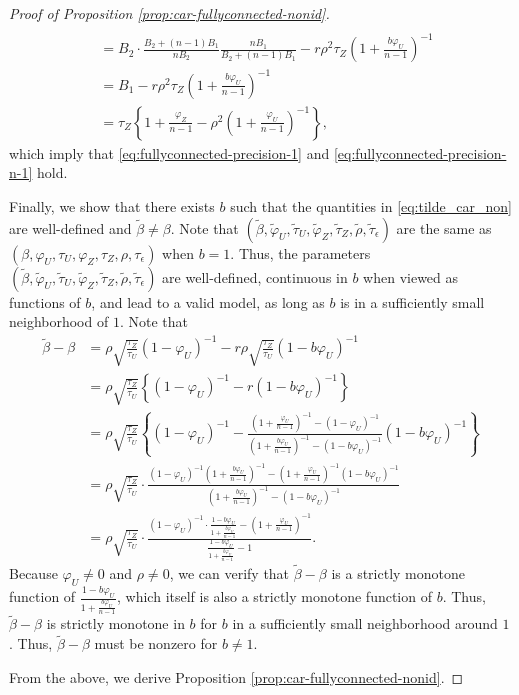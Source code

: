 \documentclass[11pt]{article}
\theoremstyle{definition}
\theoremstyle{remark}
\begin{document}
\begin{proof}[Proof of Proposition \ref{prop:car-fullyconnected-nonid}]
\begin{align*}
\\
&= 
B_2 \cdot \frac{B_2+(n-1)B_1}{nB_2}
\frac{n B_1}{B_2 + (n-1)B_1} - r\rho^2\tau_Z \left(1+\frac{b\varphi_U}{n-1}\right)^{-1}
\\ &= B_1 - r\rho^2\tau_Z \left(1+\frac{b\varphi_U}{n-1}\right)^{-1}
\\
& = \tau_Z\left\{1+\frac{\varphi_Z}{n-1} - \rho^2 \left(1+ \frac{\varphi_U}{n-1}\right)^{-1} \right\}, 
\end{align*} 
which imply that \eqref{eq:fullyconnected-precision-1}
and \eqref{eq:fullyconnected-precision-n-1} hold. 


Finally, we show that there exists $b$ such that the quantities in \eqref{eq:tilde_car_non} are well-defined and $\tilde\beta \ne \beta$. 
Note that $(\tilde\beta, \tilde\varphi_U, \tilde\tau_U, \tilde\varphi_Z, \tilde\tau_Z, \tilde\rho, \tilde\tau_\epsilon)$ are the same as $(\beta, \varphi_U, \tau_U, \varphi_Z, \tau_Z, \rho, \tau_\epsilon)$ when $b=1$. 
Thus, the parameters $(\tilde\beta, \tilde\varphi_U, \tilde\tau_U, \tilde\varphi_Z, \tilde\tau_Z, \tilde\rho, \tilde\tau_\epsilon)$ are well-defined, continuous in $b$ when viewed as functions of $b$, and lead to a valid model, as long as $b$ is in a sufficiently small neighborhood of $1$. 
Note that 
\begin{align*}
    \tilde\beta - \beta & = 
    \rho\sqrt{\frac{\tau_Z}{\tau_U}}(1-\varphi_U)^{-1} - r\rho\sqrt{\frac{\tau_Z}{\tau_U}}(1-b\varphi_U)^{-1}
    \\ &= 
    \rho\sqrt{\frac{\tau_Z}{\tau_U}} 
    \left\{ (1-\varphi_U)^{-1}  - r (1-b\varphi_U)^{-1}\right\}\\
    & = 
    \rho\sqrt{\frac{\tau_Z}{\tau_U}} 
    \left\{ (1-\varphi_U)^{-1}  - \frac{\left(1 + \frac{\varphi_U}{n-1} \right)^{-1} - \left(1-\varphi_U\right)^{-1}}{\left(1 + \frac{b\varphi_U}{n-1} \right)^{-1} - \left(1-b\varphi_U\right)^{-1}}  (1-b\varphi_U)^{-1}\right\}\\
    & = \rho\sqrt{\frac{\tau_Z}{\tau_U}} \cdot
    \frac{
    (1-\varphi_U)^{-1}\left(1 + \frac{b\varphi_U}{n-1} \right)^{-1} - \left(1 + \frac{\varphi_U}{n-1} \right)^{-1} (1-b\varphi_U)^{-1}
    }{\left(1 + \frac{b\varphi_U}{n-1} \right)^{-1} - \left(1-b\varphi_U\right)^{-1}}\\
    & = 
    \rho\sqrt{\frac{\tau_Z}{\tau_U}} \cdot
    \frac{
    (1-\varphi_U)^{-1} \cdot
    \frac{1-b\varphi_U}{ 1 + \frac{b\varphi_U}{n-1} }
     - \left(1 + \frac{\varphi_U}{n-1} \right)^{-1} 
    }{\frac{1-b\varphi_U}{ 1 + \frac{b\varphi_U}{n-1} } - 1}.
\end{align*}
Because $\varphi_U \ne 0$ and $\rho \ne 0$, we can verify that $ \tilde\beta - \beta$ is a strictly monotone function of $\frac{1-b\varphi_U}{ 1 + \frac{b\varphi_U}{n-1} }$, which itself is also a strictly monotone function of $b$. 
Thus, $\tilde\beta - \beta$ is strictly monotone in $b$ for $b$ in a sufficiently small neighborhood around $1$. 
Thus, $\tilde\beta - \beta$ must be nonzero for $b\ne 1$. 


From the above, we derive Proposition \ref{prop:car-fullyconnected-nonid}. 
\end{proof}
\end{document}
